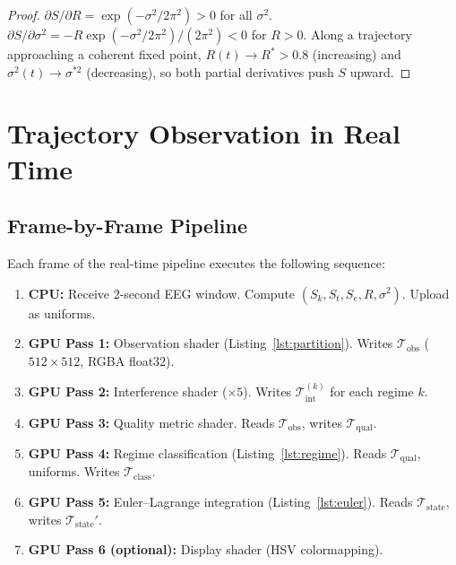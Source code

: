 \documentclass[11pt,twocolumn,a4paper]{article}
\newcommand{\Sk}{S_k}
\newcommand{\St}{S_t}
\newcommand{\Se}{S_e}
\newcommand{\Tex}{\mathcal{T}}
\begin{document}
\begin{proof}
$\partial S / \partial R = \exp(-\sigma^2/2\pi^2) > 0$ for all $\sigma^2$.
$\partial S / \partial \sigma^2 = -R \exp(-\sigma^2/2\pi^2) / (2\pi^2) < 0$ for $R > 0$.
Along a trajectory approaching a coherent fixed point, $R(t) \to R^* > 0.8$ (increasing) and $\sigma^2(t) \to \sigma^{*2}$ (decreasing), so both partial derivatives push $S$ upward.
\end{proof}



\section{Trajectory Observation in Real Time}
\label{sec:realtime}

\subsection{Frame-by-Frame Pipeline}

Each frame of the real-time pipeline executes the following sequence:

\begin{enumerate}[leftmargin=*,itemsep=1pt]
\item \textbf{CPU:} Receive 2-second EEG window.
Compute $(\Sk, \St, \Se, R, \sigma^2)$.
Upload as uniforms.

\item \textbf{GPU Pass 1:} Observation shader (Listing~\ref{lst:partition}).
Writes $\Tex_{\mathrm{obs}}$ ($512 \times 512$, RGBA float32).

\item \textbf{GPU Pass 2:} Interference shader ($\times 5$).
Writes $\Tex_{\mathrm{int}}^{(k)}$ for each regime $k$.

\item \textbf{GPU Pass 3:} Quality metric shader.
Reads $\Tex_{\mathrm{obs}}$, writes $\Tex_{\mathrm{qual}}$.

\item \textbf{GPU Pass 4:} Regime classification (Listing~\ref{lst:regime}).
Reads $\Tex_{\mathrm{qual}}$, uniforms.
Writes $\Tex_{\mathrm{class}}$.

\item \textbf{GPU Pass 5:} Euler--Lagrange integration (Listing~\ref{lst:euler}).
Reads $\Tex_{\mathrm{state}}$, writes $\Tex_{\mathrm{state}}'$.

\item \textbf{GPU Pass 6 (optional):} Display shader (HSV colormapping).
\end{enumerate}
\end{document}
